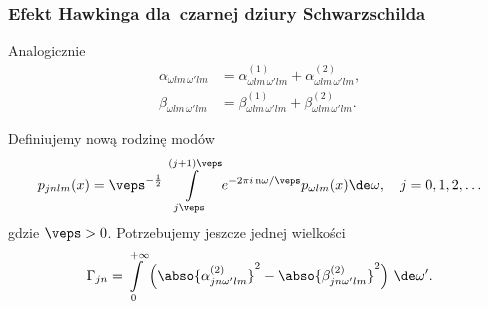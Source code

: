 \documentclass{beamer}  %
\begin{document}
\begin{frame}
  \frametitle{Efekt Hawkinga dla~czarnej dziury Schwarzschilda}

  \begin{block}{Analogicznie}
    \begin{subequations}
      \begin{align}
        \label{eq:HawkingPromieniowanie-26}
        \alpha_{ \omega l m\, \omega' l m }
        &= \alpha_{ \omega l m\, \omega' l m }^{ ( 1 ) }
          + \alpha_{ \omega l m\, \omega' l m }^{ ( 2 ) }, \\
        \beta_{ \omega l m\, \omega' l m }
        &= \beta_{ \omega l m\, \omega' l m }^{ ( 1 ) }
          + \beta_{ \omega l m\, \omega' l m }^{ ( 2 ) }.
      \end{align}
    \end{subequations}
  \end{block}

  \begin{block}{Definiujemy nową rodzinę modów}
    \begin{equation}
      \label{eq:HawkingPromieniowanie-27}
      p_{ j n l m }( x )
      = \veps^{ -\frac{ 1 }{ 2 } } \int\limits_{ j \veps }^{ ( j + 1 ) \veps }
      e^{ -2 \pi i\, \mathrm{n} \omega / \veps } p_{ \omega l m }( x ) \de \omega,
      \quad j = 0, 1, 2, \ldots
    \end{equation}
    gdzie $\veps > 0$. Potrzebujemy jeszcze jednej wielkości
    \begin{equation}
      \label{eq:HawkingPromieniowanie-28}
      \Gamma_{ j n }
      = \int\limits_{ 0 }^{ +\infty }
      \left( \abso{ \alpha_{ j n \omega' l m }^{ ( 2 ) } }^{ 2 }
        - \abso{ \beta_{ j n \omega' l m }^{ ( 2 ) } }^{ 2 } \right)\,
      \de \omega'.
    \end{equation}
  \end{block}

\end{frame}
\end{document}
